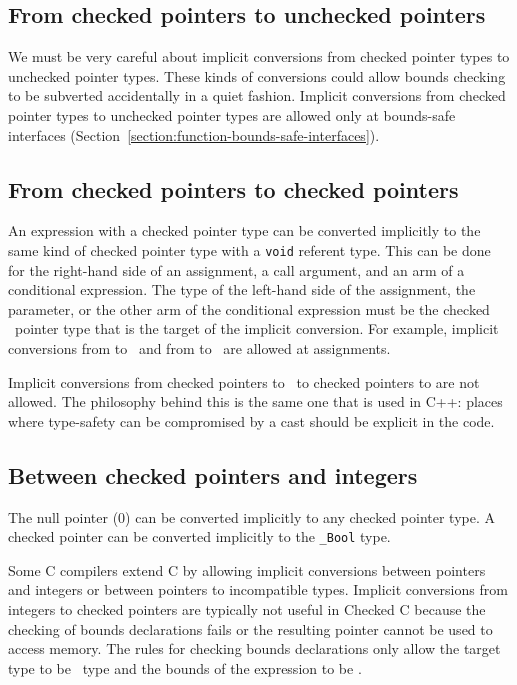 \subsection{From checked pointers to unchecked pointers}

We must be very careful about implicit conversions from checked pointer
types to unchecked pointer types.  These kinds of conversions could allow bounds checking to
be subverted accidentally in a quiet fashion. Implicit conversions from checked pointer types to
unchecked pointer types are allowed only at bounds-safe interfaces
(Section~\ref{section:function-bounds-safe-interfaces}).

\subsection{From checked pointers to checked pointers}

An expression with a checked pointer type can be converted implicitly to the same kind
of checked pointer type with a \texttt{void} referent type.
This can be done for the right-hand side of an assignment, a call argument, 
and an arm of a conditional expression.  
The type of the left-hand side of the assignment, the parameter, or the other
arm of the conditional expression
must be the checked \void\ pointer type that is the target of the implicit
conversion. For example, implicit conversions from 
 to \ptrvoid\ and from  to \arrayptrvoid\ are allowed 
at assignments. 

Implicit conversions from checked pointers to \void\ to checked pointers to  are not allowed.
The philosophy behind this is the same one that is used in C++: places where type-safety
can be compromised by a cast should be explicit in the code.

\subsection{Between checked pointers and integers}

The null pointer (0) can be converted implicitly to any checked pointer type.
A checked pointer can be converted implicitly to the \texttt{\_Bool} type.

Some C compilers extend C by allowing implicit conversions between pointers
and integers or between pointers to incompatible types.  Implicit conversions
from integers to checked pointers are typically not useful in Checked C because
the checking of bounds declarations fails or the resulting pointer cannot
be used to access memory.   The rules for checking bounds declarations only
allow the target type to be \arrayptr\ type and the bounds of the expression to be
\boundsnone.

